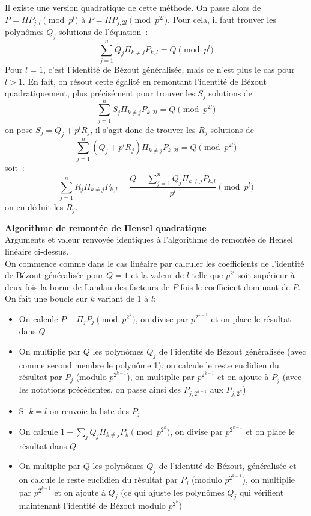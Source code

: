 \documentclass[a4paper,11pt]{book}
\begin{document}
\begin{giacjshere}
Il existe une version quadratique de cette méthode. On passe alors de
$P=\Pi P_{j,l} \pmod {p^l}$ à $P=\Pi P_{j,2l} \pmod {p^{2l}}$. Pour
cela, il faut trouver les polynômes $Q_j$ solutions de l'équation~:
\[ \sum_{j=1}^n Q_j \Pi_{k\neq j} P_{k,l}=Q \pmod {p^l}\]
Pour $l=1$, c'est l'identité de Bézout généralisée, mais ce n'est plus le
cas pour $l>1$. En fait, on résout cette égalité en remontant l'identité
de Bézout quadratiquement, plus précisément pour trouver les $S_j$
solutions de
\[ \sum_{j=1}^n S_j \Pi_{k\neq j} P_{k,2l}=Q \pmod {p^{2l}}\]
on pose $S_j=Q_j+p^l R_j$, il s'agit donc de trouver les $R_j$ solutions de
\[ \sum_{j=1}^n (Q_j+p^l R_j) \Pi_{k\neq j} P_{k,2l}=Q \pmod {p^{2l}}\]
soit~:
\[ \sum_{j=1}^n R_j \Pi_{k\neq j} P_{k,l}
=\frac{Q-\sum_{j=1}^n Q_j \Pi_{k\neq j} P_{k,l} }{p^l} \pmod {p^l}\]
on en déduit les $R_j$.

{\bf Algorithme de remontée de Hensel quadratique}\\
Arguments et valeur renvoyée identiques à l'algorithme de remontée de Hensel
linéaire ci-dessus.\\
On commence comme dans le cas linéaire par calculer les coefficients
de l'identité de Bézout généralisée pour $Q=1$ et la valeur de $l$ telle
que $p^{2^l}$ soit supérieur à deux fois la borne de Landau des facteurs
de $P$ fois le coefficient dominant de $P$.\\
On fait une boucle sur $k$ variant de 1 à $l$:
\begin{itemize}
\item On calcule $P-\Pi_j P_j \pmod {p^{2^k}}$, on divise par $p^{2^{k-1}}$
et on place le résultat dans $Q$
\item On multiplie par $Q$ les polynômes $Q_j$ de l'identité de Bézout
généralisée (avec comme second membre le polynôme 1),
on calcule le reste euclidien du résultat par $P_j$ (modulo $p^{2^{k-1}}$), 
on multiplie par $p^{2^{k-1}}$ et on ajoute à $P_j$ (avec les notations
précédentes, on passe ainsi des $P_{j,2^{k-1}}$ aux $P_{j,2^k}$)
\item Si $k=l$ on renvoie la liste des $P_j$
\item On calcule $1-\sum_j Q_j \Pi_{k\neq j} P_k \pmod {p^{2^k}}$, on
divise par $p^{2^{k-1}}$ et on place le résultat dans $Q$
\item On multiplie par $Q$ les polynômes $Q_j$ de l'identité de Bézout,
généralisée et on calcule le reste euclidien du résultat par 
$P_j$ (modulo $p^{2^{k-1}}$), on multiplie par $p^{2^{k-1}}$ et 
on ajoute à $Q_j$ (ce qui ajuste les polynômes $Q_j$ qui vérifient
maintenant l'identité de Bézout modulo $p^{2^k}$)
\end{itemize}


\end{giacjshere}
\end{document}
